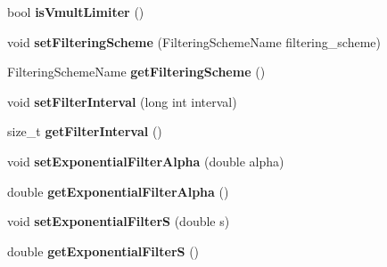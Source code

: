 \begin{DoxyCompactItemize}
\item 
\hypertarget{classnatrium_1_1SolverConfiguration_a1b7d3ab12c72d664ba96131508535eed}{
bool {\bfseries isVmultLimiter} ()}
\label{classnatrium_1_1SolverConfiguration_a1b7d3ab12c72d664ba96131508535eed}

\item 
\hypertarget{classnatrium_1_1SolverConfiguration_a8f0374bd2bbde799d0db3828ce12c377}{
void {\bfseries setFilteringScheme} (FilteringSchemeName filtering\_\-scheme)}
\label{classnatrium_1_1SolverConfiguration_a8f0374bd2bbde799d0db3828ce12c377}

\item 
\hypertarget{classnatrium_1_1SolverConfiguration_aa7bd62f2ce2a4d671ccb4d011833d73e}{
FilteringSchemeName {\bfseries getFilteringScheme} ()}
\label{classnatrium_1_1SolverConfiguration_aa7bd62f2ce2a4d671ccb4d011833d73e}

\item 
\hypertarget{classnatrium_1_1SolverConfiguration_a5e77d7f3fa229d0ee2c1c03f412d3f6e}{
void {\bfseries setFilterInterval} (long int interval)}
\label{classnatrium_1_1SolverConfiguration_a5e77d7f3fa229d0ee2c1c03f412d3f6e}

\item 
\hypertarget{classnatrium_1_1SolverConfiguration_a44d5f347a8941e9718fc9ee236b309a4}{
size\_\-t {\bfseries getFilterInterval} ()}
\label{classnatrium_1_1SolverConfiguration_a44d5f347a8941e9718fc9ee236b309a4}

\item 
\hypertarget{classnatrium_1_1SolverConfiguration_ac7a78062007bb0f3127f9b6325de7be6}{
void {\bfseries setExponentialFilterAlpha} (double alpha)}
\label{classnatrium_1_1SolverConfiguration_ac7a78062007bb0f3127f9b6325de7be6}

\item 
\hypertarget{classnatrium_1_1SolverConfiguration_a6bfd25f3fcc09328d00902c0ff2898d2}{
double {\bfseries getExponentialFilterAlpha} ()}
\label{classnatrium_1_1SolverConfiguration_a6bfd25f3fcc09328d00902c0ff2898d2}

\item 
\hypertarget{classnatrium_1_1SolverConfiguration_a94e94e7b9fff7e689db502f14fc17a4b}{
void {\bfseries setExponentialFilterS} (double s)}
\label{classnatrium_1_1SolverConfiguration_a94e94e7b9fff7e689db502f14fc17a4b}

\item 
\hypertarget{classnatrium_1_1SolverConfiguration_a2b98b8bd11588d0f7b4cd00d89e08294}{
double {\bfseries getExponentialFilterS} ()}
\label{classnatrium_1_1SolverConfiguration_a2b98b8bd11588d0f7b4cd00d89e08294}


\end{DoxyCompactItemize}
